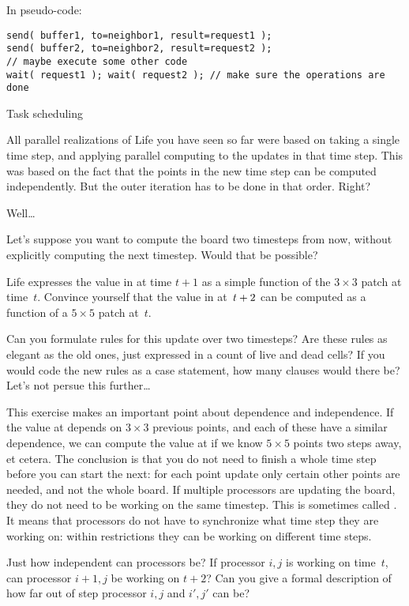 In pseudo-code:
\begin{verbatim}
send( buffer1, to=neighbor1, result=request1 );
send( buffer2, to=neighbor2, result=request2 );
// maybe execute some other code
wait( request1 ); wait( request2 ); // make sure the operations are done
\end{verbatim}

 {Task scheduling}
\label{sec:dag}

All parallel realizations of Life you have seen so far were based
on taking a single time step, and applying parallel computing to
the updates in that time step. This was based on the fact that
the points in the new time step can be computed independently.
But the outer iteration has to be done in that order. Right?

Well\ldots

Let's suppose you want to compute the board two timesteps from
now, without explicitly computing the next timestep. Would that be possible?

\begin{exercise}
  Life expresses the value in  at time $t+1$ as a simple
  function of the $3\times3$ patch  at time~$t$.
  Convince yourself that the value in  at~$t+\nobreak2$ can be
  computed as a function of a $5\times5$ patch at~$t$.

  Can you formulate rules for this update over two timesteps? Are
  these rules as elegant as the old ones, just expressed in a count of
  live and dead cells? If you would code the new rules as a case
  statement, how many clauses would there be? Let's not persue this
  further\ldots
\end{exercise}

This exercise makes an important point about dependence and
independence. If the value at  depends on
$3\times3$ previous points, and each of these have a similar
dependence, we can compute the value at  
if we know $5\times5$ points two steps away, et cetera.
The conclusion is that you do not need to finish a whole time step before you 
can start the next: for each point update only certain other points
are needed, and not the whole board. If multiple processors are updating the board,
they do not need to be working on the same timestep.
This
is sometimes called .
It means that processors do not have to synchronize what time step they are working on:
within restrictions they can be working on different time steps.

\begin{exercise}
  Just how independent can processors be? If processor $i,j$ is
  working on time~$t$, can processor $i+1,j$ be working on $t+2$? Can
  you give a formal description of how far out of step processor $i,j$
  and $i',j'$ can be?
\end{exercise}

